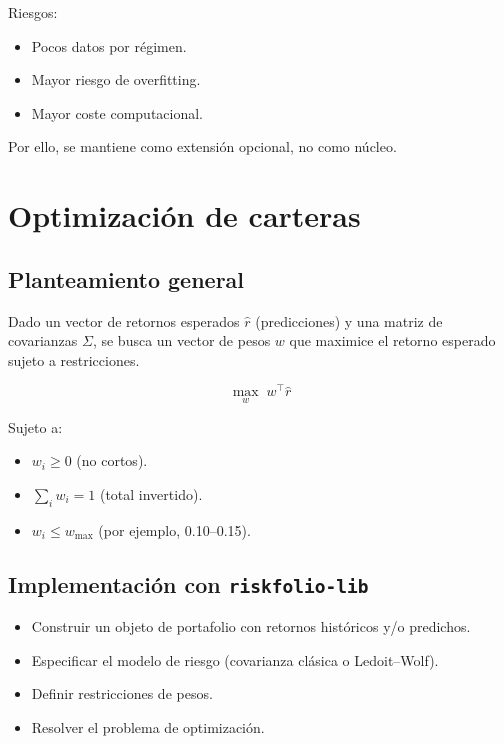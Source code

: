 \documentclass[12pt]{article}
\begin{document}
Riesgos:

\begin{itemize}
    \item Pocos datos por régimen.
    \item Mayor riesgo de overfitting.
    \item Mayor coste computacional.
\end{itemize}

Por ello, se mantiene como extensión opcional, no como núcleo.

\section{Optimización de carteras}

\subsection{Planteamiento general}

Dado un vector de retornos esperados $\hat{r}$ (predicciones) y una matriz de covarianzas $\Sigma$, se busca un vector de pesos $w$ que maximice el retorno esperado sujeto a restricciones.



\[
\max_w \; w^\top \hat{r}
\]



Sujeto a:

\begin{itemize}
    \item $w_i \ge 0$ (no cortos).
    \item $\sum_i w_i = 1$ (total invertido).
    \item $w_i \le w_{\max}$ (por ejemplo, 0.10--0.15).
\end{itemize}

\subsection{Implementación con \texttt{riskfolio-lib}}

\begin{itemize}
    \item Construir un objeto de portafolio con retornos históricos y/o predichos.
    \item Especificar el modelo de riesgo (covarianza clásica o Ledoit--Wolf).
    \item Definir restricciones de pesos.
    \item Resolver el problema de optimización.
\end{itemize}
\end{document}
